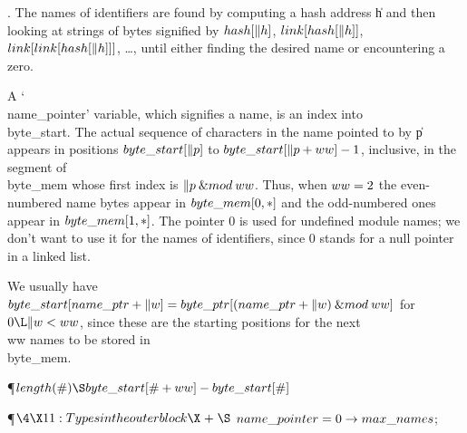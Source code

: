 . The names of identifiers are found by computing a hash address \|h and
then looking at strings of bytes signified by $\\{hash}[\|h]$, $\\{link}[%
\\{hash}[\|h]]$,
$\\{link}[\\{link}[\\{hash}[\|h]]]$, \dots, until either finding the desired
name
or encountering a zero.

A `\\{name\_pointer}' variable, which signifies a name, is an index into
\\{byte\_start}. The actual sequence of characters in the name pointed to by
\|p appears in positions $\\{byte\_start}[\|p]$ to $\\{byte\_start}[\|p+%
\\{ww}]-1$, inclusive,
in the segment of \\{byte\_mem} whose first index is $\|p\mathbin{\&{mod}}%
\\{ww}$. Thus, when
$\\{ww}=2$ the even-numbered name bytes appear in $\\{byte\_mem}[0,\hbox{$*$}]$
and the odd-numbered ones appear in $\\{byte\_mem}[1,\hbox{$*$}]$.
The pointer 0 is used for undefined module names; we don't
want to use it for the names of identifiers, since 0 stands for a null
pointer in a linked list.

We usually have $\\{byte\_start}[\\{name\_ptr}+\|w]=\\{byte\_ptr}[(\\{name%
\_ptr}+\|w)\mathbin{\&{mod}}\\{ww}]$
for $0\L\|w<\\{ww}$, since these are the starting positions for the next \\{ww}
names to be stored in \\{byte\_mem}.

\Y\P\D {}$\\{length}(\#)\S\\{byte\_start}[\#+\\{ww}]-\\{byte\_start}[\#]$%
\par
\Y\P$\4\X11:Types in the outer block\X\mathrel{+}\S$\6
$\\{name\_pointer}=0\to\\{max\_names}$;\par
\fi

